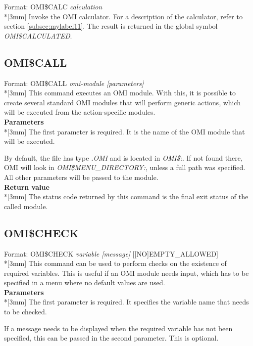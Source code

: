\documentclass[a4paper]{book}
\renewcommand{\indent}{\hspace*{5mm}}
\begin{document}
\indent Format: \textsf{OMI{\$}CALC \textit{calculation}}\\*[3mm]
Invoke the OMI calculator. For a description of the calculator, refer to 
section \ref{subsec:mylabel11}.
The result is returned in the global symbol \textsl{OMI{\$}CALCULATED}.

\subsection{OMI{\$}CALL}
\label{subsubsec:mylabel43}

\indent Format: \textsf{OMI{\$}CALL \textit{omi-module [parameters]}}\\*[3mm]
This command executes an OMI module. With this, it is possible to create 
several standard OMI modules that will perform generic actions, which will 
be executed from the action-specific modules.\\[3mm]
\textbf{Parameters}\\*[3mm]
The first parameter is required. It is the name of the OMI module that will 
be executed.

By default, the file has type \textsl{.OMI} and is located in \textsl{OMI{\$}:}. If not found 
there, OMI will look in \textsl{OMI{\$}MENU{\_}DIRECTORY:}, unless a full path was 
specified. \\
All other parameters will be passed to the module.\\[3mm]
\textbf{Return value}\\*[3mm]
The status code returned by this command is the final exit status of the 
called module.

\subsection{OMI{\$}CHECK}
\label{subsubsec:mylabel44}

\indent Format: \textsf{OMI{\$}CHECK \textit{variable [message]} [[NO]EMPTY{\_}ALLOWED]}\\*[3mm]
This command can be used to perform checks on the existence of required 
variables. This is useful if an OMI module needs input, which has to be 
specified in a menu where no default values are used.\\[3mm]
\textbf{Parameters}\\*[3mm]
The first parameter is required. It specifies the variable name that needs 
to be checked.

If a message needs to be displayed when the required variable has not been 
specified, this can be passed in the second parameter. This is optional.
\end{document}
